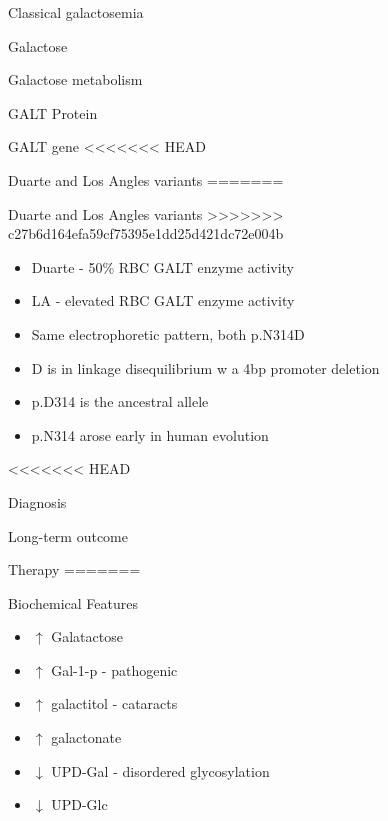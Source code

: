 \documentclass[presentation, smaller]{beamer}
\begin{document}
\begin{frame}[label={sec:orgheadline1}]{Classical galactosemia}
\begin{frame}[label={sec:orgheadline2}]{Galactose}
\begin{frame}[label={sec:orgheadline3}]{Galactose metabolism}
\begin{frame}[label={sec:orgheadline4}]{GALT Protein}
\begin{frame}[label={sec:orgheadline6}]{GALT gene}
<<<<<<< HEAD
\begin{frame}[label={sec:orgheadline7}]{Duarte and Los Angles variants}
=======
\begin{frame}[label={sec:org59e10e5}]{Duarte and Los Angles variants}
>>>>>>> c27b6d164efa59cf75395e1dd25d421dc72e004b
\begin{itemize}
\item Duarte - 50\% RBC GALT enzyme activity
\item LA - elevated RBC GALT enzyme activity
\item Same electrophoretic pattern, both p.N314D
\item D is in linkage disequilibrium w a 4bp promoter deletion
\item p.D314 is the ancestral allele
\item p.N314 arose early in human evolution
\end{itemize}
\end{frame}


<<<<<<< HEAD
\begin{frame}[label={sec:orgheadline8}]{Diagnosis}
\end{frame}
\begin{frame}[label={sec:orgheadline9}]{Long-term outcome}
\end{frame}

\begin{frame}[label={sec:orgheadline10}]{Therapy}
=======
\begin{frame}[label={sec:org3c84768}]{Biochemical Features}
\begin{itemize}
\item \(\uparrow\)  Galatactose
\item \(\uparrow\) Gal-1-p - pathogenic
\item \(\uparrow\)  galactitol - cataracts
\item \(\uparrow\) galactonate
\item \(\downarrow\) UPD-Gal - disordered glycosylation
\item \(\downarrow\) UPD-Glc
\end{itemize}
\end{frame}


\end{frame}
\end{frame}
\end{frame}
\end{frame}
\end{frame}
\end{frame}
\end{frame}
\end{document}
